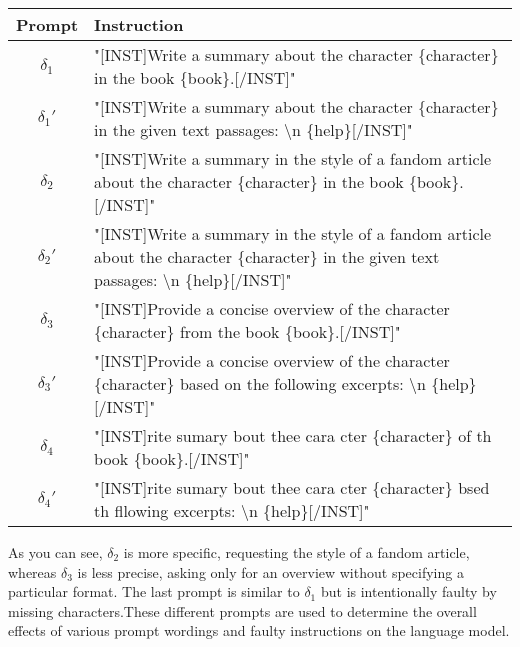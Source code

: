\begin{center}
    \begin{tabular}{|c|m{10cm}|}
        \hline
        Prompt        & Instruction                                                                                                                                             \\ [0.5ex]
        \hline\hline
        $\delta_{1}$  & "[INST]Write a summary about the character \{character\} in the book \{book\}.[/INST]"                                                                  \\
        \hline
        $\delta_{1}'$ & "[INST]Write a summary about the character \{character\} in the given text passages: \textbackslash n \{help\}[/INST]"                                  \\
        \hline\hline
        $\delta_{2}$  & "[INST]Write a summary in the style of a fandom article about the character \{character\} in the book \{book\}.[/INST]"                                 \\
        \hline
        $\delta_{2}'$ & "[INST]Write a summary in the style of a fandom article about the character \{character\} in the given text passages: \textbackslash n \{help\}[/INST]" \\
        \hline\hline
        $\delta_{3}$  & "[INST]Provide a concise overview of the character \{character\} from the book \{book\}.[/INST]"                                                        \\
        \hline
        $\delta_{3}'$ & "[INST]Provide a concise overview of the character \{character\} based on the following excerpts: \textbackslash n \{help\}[/INST]"                     \\
        \hline\hline
        $\delta_{4}$  & "[INST]rite sumary bout thee cara cter \{character\} of th book \{book\}.[/INST]"                                                                       \\
        \hline
        $\delta_{4}'$ & "[INST]rite sumary bout thee cara cter \{character\} bsed th fllowing excerpts: \textbackslash n \{help\}[/INST]"                                       \\ [1ex]
        \hline
    \end{tabular}
\end{center}



As you can see, $\delta_{2}$ is more specific, requesting the style of a fandom article, whereas $\delta_{3}$ is less precise, asking only for an overview without specifying a particular format. The last prompt is similar to $\delta_{1}$ but is intentionally faulty by missing characters.These different prompts are used to determine the overall effects of various prompt wordings and faulty instructions on the language model.



